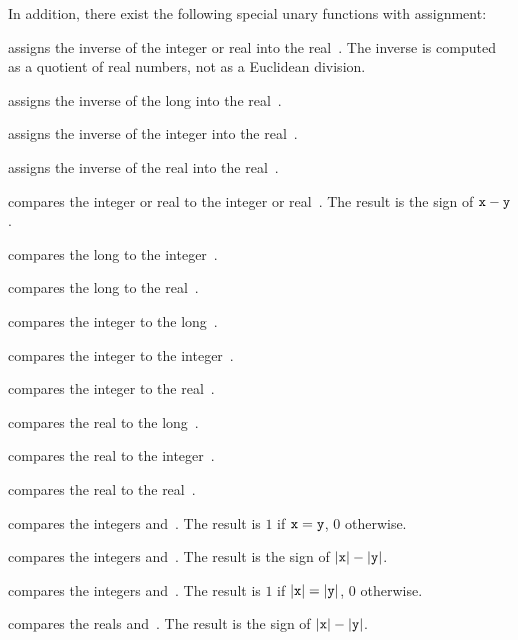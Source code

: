 \noindent In addition, there exist the following special unary functions with
assignment:

 assigns the inverse of the integer or
real  into the real~. The inverse is computed as a quotient
of real numbers, not as a Euclidean division.

 assigns the inverse of the long 
into the real~.

 assigns the inverse of the integer 
into the real~.

 assigns the inverse of the real  into
the real~.


 compares the integer or real  to the
integer or real~. The result is the sign of ${\tt x}-{\tt y}$.

 compares the long  to the
integer~.

 compares the long  to the real~.

 compares the integer  to the
long~.

 compares the integer  to the
integer~.

 compares the integer  to the
real~.

 compares the real  to the
long~.

 compares the real  to the
integer~.

 compares the real  to the real~.

 compares the integers  and~.
The result is $1$ if ${\tt x} = {\tt y}$, $0$ otherwise.

 compares the integers  and~.
The result is the sign of $|{\tt x}| - |{\tt y}|$.

 compares the integers  and~.
The result is $1$ if $|{\tt x}| = |{\tt y}|$, $0$ otherwise.

 compares the reals  and~.
The result is the sign of $|{\tt x}| - |{\tt y}|$.

